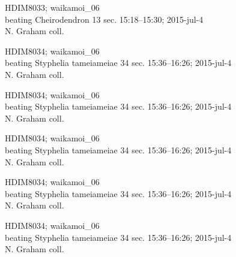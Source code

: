 \documentclass[2pt]{extarticle}
\begin{document}
\noindent
\parbox{0.16\textwidth}{\tiny \raggedright \rule[-0.3\baselineskip]{0pt}{10pt}HDIM8033; waikamoi\_06\\ beating Cheirodendron 13 sec. 15:18--15:30; 2015-jul-4\\ N. Graham coll.}
\parbox{0.16\textwidth}{\tiny \raggedright \rule[-0.3\baselineskip]{0pt}{10pt}HDIM8034; waikamoi\_06\\ beating Styphelia tameiameiae 34 sec. 15:36--16:26; 2015-jul-4\\ N. Graham coll.}
\parbox{0.16\textwidth}{\tiny \raggedright \rule[-0.3\baselineskip]{0pt}{10pt}HDIM8034; waikamoi\_06\\ beating Styphelia tameiameiae 34 sec. 15:36--16:26; 2015-jul-4\\ N. Graham coll.}
\parbox{0.16\textwidth}{\tiny \raggedright \rule[-0.3\baselineskip]{0pt}{10pt}HDIM8034; waikamoi\_06\\ beating Styphelia tameiameiae 34 sec. 15:36--16:26; 2015-jul-4\\ N. Graham coll.}
\parbox{0.16\textwidth}{\tiny \raggedright \rule[-0.3\baselineskip]{0pt}{10pt}HDIM8034; waikamoi\_06\\ beating Styphelia tameiameiae 34 sec. 15:36--16:26; 2015-jul-4\\ N. Graham coll.}
\parbox{0.16\textwidth}{\tiny \raggedright \rule[-0.3\baselineskip]{0pt}{10pt}HDIM8034; waikamoi\_06\\ beating Styphelia tameiameiae 34 sec. 15:36--16:26; 2015-jul-4\\ N. Graham coll.} \\ 
\vspace{0.001in} 
\end{document}

